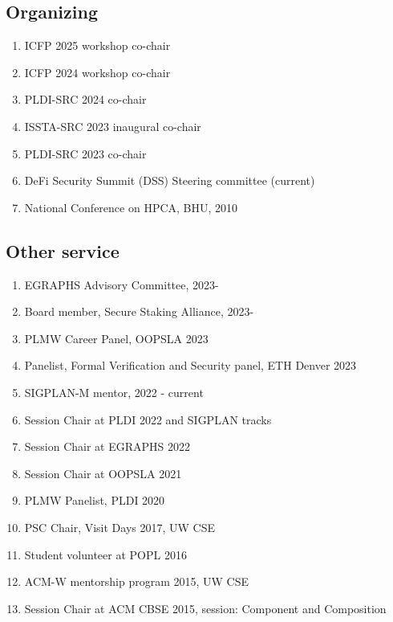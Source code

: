 \documentclass[margin, 10pt]{res} %
\begin{document}
\begin{resume}
\subsection{Organizing}
\begin{enumerate}[itemsep=-2pt]
  \item ICFP 2025 workshop co-chair
  \item ICFP 2024 workshop co-chair
  \item PLDI-SRC 2024 co-chair
  \item ISSTA-SRC 2023 inaugural co-chair
  \item PLDI-SRC 2023 co-chair
  \item DeFi Security Summit (DSS) Steering committee (current)
  \item National Conference on HPCA, BHU, 2010
\end{enumerate}

\subsection{Other service}
\begin{enumerate}[itemsep=-2pt]
\item EGRAPHS Advisory Committee, 2023-
\item Board member, Secure Staking Alliance, 2023-
\item PLMW Career Panel, OOPSLA 2023
\item {Panelist, Formal Verification and Security panel, ETH Denver 2023}
\item SIGPLAN-M mentor, 2022 - current
\item Session Chair at PLDI 2022 and SIGPLAN tracks
\item Session Chair at EGRAPHS 2022
\item Session Chair at OOPSLA 2021
\item PLMW Panelist, PLDI 2020
\item PSC Chair, Visit Days 2017, UW CSE
\item Student volunteer at POPL 2016
\item ACM-W mentorship program 2015, UW CSE
\item Session Chair at ACM CBSE 2015, session: Component and Composition
\end{enumerate}


\end{resume}
\end{document}
